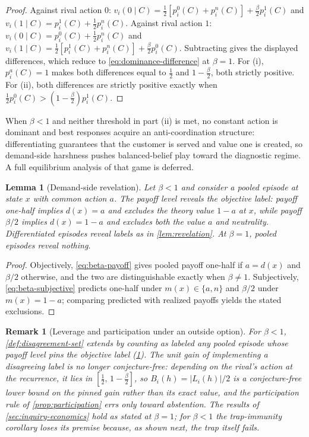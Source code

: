 \documentclass[11pt]{article}
\newtheorem{lemma}[assumption]{Lemma}
\newtheorem{remark}[assumption]{Remark}
\begin{document}
\begin{proof}
Against rival action $0$:
$v_i(0\mid C)=\tfrac12[p_i^0(C)+p_i^n(C)]+\tfrac{\beta}{2}p_i^1(C)$ and
$v_i(1\mid C)=p_i^1(C)+\tfrac12 p_i^n(C)$.  Against rival action $1$:
$v_i(0\mid C)=p_i^0(C)+\tfrac12 p_i^n(C)$ and
$v_i(1\mid C)=\tfrac12[p_i^1(C)+p_i^n(C)]+\tfrac{\beta}{2}p_i^0(C)$.
Subtracting gives the displayed differences, which reduce to
\cref{eq:dominance-difference} at $\beta=1$.  For (i), $p_i^a(C)=1$ makes both
differences equal to $\tfrac12$ and $1-\tfrac{\beta}{2}$, both strictly
positive.  For (ii), both differences are strictly positive exactly when
$\tfrac12 p_i^0(C)>(1-\tfrac{\beta}{2})p_i^1(C)$.
\end{proof}

When $\beta<1$ and neither threshold in part (ii) is met, no constant action
is dominant and best responses acquire an anti-coordination structure:
differentiating guarantees that the customer is served and value one is
created, so demand-side harshness pushes balanced-belief play toward the
diagnostic regime.  A full equilibrium analysis of that game is deferred.

\begin{lemma}[Demand-side revelation]
\label{lem:demand-revelation}
Let $\beta<1$ and consider a pooled episode at state $x$ with common action
$a$.  The payoff level reveals the objective label: payoff one-half implies
$d(x)=a$ and excludes the theory value $1-a$ at $x$, while payoff $\beta/2$
implies $d(x)=1-a$ and excludes both the value $a$ and neutrality.
Differentiated episodes reveal labels as in \cref{lem:revelation}.  At
$\beta=1$, pooled episodes reveal nothing.
\end{lemma}

\begin{proof}
Objectively, \cref{eq:beta-payoff} gives pooled payoff one-half if $a=d(x)$
and $\beta/2$ otherwise, and the two are distinguishable exactly when
$\beta\neq1$.  Subjectively, \cref{eq:beta-subjective} predicts one-half under
$m(x)\in\{a,n\}$ and $\beta/2$ under $m(x)=1-a$; comparing predicted with
realized payoffs yields the stated exclusions.
\end{proof}

\begin{remark}[Leverage and participation under an outside option]
\label{rem:leverage-beta}
For $\beta<1$, \cref{def:disagreement-set} extends by counting as labeled any
pooled episode whose payoff level pins the objective label
(\cref{lem:demand-revelation}).  The unit gain of implementing a disagreeing
label is no longer conjecture-free: depending on the rival's action at the
recurrence, it lies in $[\tfrac12,\,1-\tfrac{\beta}{2}]$, so
$B_i(h)=\lvert L_i(h)\rvert/2$ is a conjecture-free \emph{lower bound} on the
pinned gain rather than its exact value, and the participation rule of
\cref{prop:participation} errs only toward abstention.  The results of
\cref{sec:inquiry-economics} hold as stated at $\beta=1$; for $\beta<1$ the
trap-immunity corollary loses its premise because, as shown next, the trap
itself fails.
\end{remark}
\end{document}
